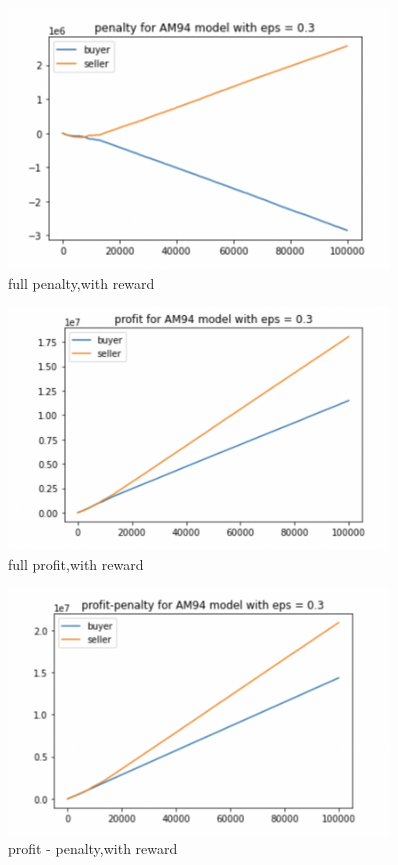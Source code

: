 \documentclass[11pt]{article}
\begin{document}
\begin{figure}[H]
	\begin{center}
	\includegraphics[width=0.9\textwidth]{13.PNG}
	\end{center}
	\caption{full penalty,with reward}
	\label{FIG.13}
\end{figure}

\begin{figure}[H]
	\begin{center}
	\includegraphics[width=0.9\textwidth]{14.PNG}
	\end{center}
	\caption{full profit,with reward}
	\label{FIG.14}
\end{figure}

\begin{figure}[H]
	\begin{center}
	\includegraphics[width=0.9\textwidth]{15.PNG}
	\end{center}
	\caption{profit - penalty,with reward}
	\label{FIG.15}
\end{figure}	
\end{document}
